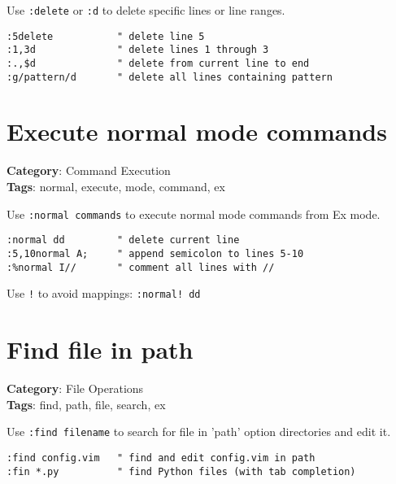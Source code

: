 {{{{{{Use {\footnotesize \Verb§:delete§} or {\footnotesize \Verb§:d§} to delete specific lines or line ranges.

\begin{Exa*}{}
\begin{Verbatim}[fontsize=\footnotesize, breaklines, breakanywhere]
:5delete           " delete line 5
:1,3d              " delete lines 1 through 3
:.,$d              " delete from current line to end
:g/pattern/d       " delete all lines containing pattern
\end{Verbatim}
\end{Exa*}

\section{Execute normal mode commands}

\textbf{Category}: Command Execution\\ \textbf{Tags}: normal, execute, mode, command, ex
\vspace{0.5cm}

Use {\footnotesize \Verb§:normal commands§} to execute normal mode commands from Ex mode.

\begin{Exa*}{}
\begin{Verbatim}[fontsize=\footnotesize, breaklines, breakanywhere]
:normal dd         " delete current line
:5,10normal A;     " append semicolon to lines 5-10
:%normal I//       " comment all lines with //
\end{Verbatim}
\end{Exa*}

Use {\footnotesize \Verb§!§} to avoid mappings: {\footnotesize \Verb§:normal! dd§}

\section{Find file in path}

\textbf{Category}: File Operations\\ \textbf{Tags}: find, path, file, search, ex
\vspace{0.5cm}

Use {\footnotesize \Verb§:find filename§} to search for file in 'path' option directories and edit it.

\begin{Exa*}{}
\begin{Verbatim}[fontsize=\footnotesize, breaklines, breakanywhere]
:find config.vim   " find and edit config.vim in path
:fin *.py          " find Python files (with tab completion)
\end{Verbatim}
\end{Exa*}

}}}}}}
